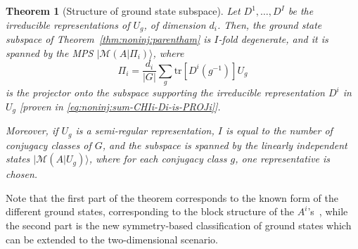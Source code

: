 \documentclass{article}
\newcommand{\tr}{\mathrm{tr}}
\newcommand{\MPS}[1]{\big\vert\mathcal M(#1)\big\rangle}
\theoremstyle{plain}
\newtheorem{theorem}[lemma]{Theorem}
\theoremstyle{definition}
\numberwithin{equation}{section}  %
\begin{document}
\begin{theorem}[Structure of ground state subspace]
    Let $D^1,\dots,D^I$ be the irreducible representations of $U_g$, of
    dimension $d_i$. Then, the ground state subspace of
    Theorem~\ref{thm:noninj:parentham} is $I$-fold degenerate, and it is
    spanned by the MPS $\MPS{A|\Pi_i}$, where
    \begin{equation}
        \label{eq:noninj:all-indep-closures}
        \Pi_i = \frac{d_i}{|G|}\sum_g \tr[D^i(g^{-1})] U_g
    \end{equation}
    is the projector onto the subspace supporting the irreducible
    representation $D^i$ in $U_g$ [proven in
        \eqref{eq:noninj:sum-CHIi-Di-is-PROJi}].

    Moreover, if $U_g$ is a semi-regular representation, $I$ is equal to the
    number of conjugacy classes of $G$, and the subspace is spanned by the
    linearly independent states $\MPS{A|U_g}$, where for each conjugacy class
    $g$, one representative is chosen.
\end{theorem}
%
\noindent
Note that the first part of the theorem corresponds to the known form of
the different ground states, corresponding to the block structure of the
$A^i$'s~\cite{fannes:FCS,perez-garcia:mps-reps}, while the second part is
the new symmetry-based classification of ground states which can be
extended to the two-dimensional scenario.
%
\end{document}
